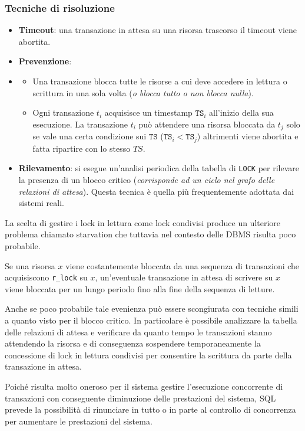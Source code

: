 \documentclass[oneside,a4paper,11pt]{book}
\theoremstyle{italicstyle}
\theoremstyle{normStyle}
\begin{document}
\subsubsection{Tecniche di risoluzione}
\begin{itemize}
  \item \textbf{Timeout}: una transazione in attesa su una risorsa trascorso il timeout viene abortita.
  \item \textbf{Prevenzione}: 
  \item \begin{itemize}
    \item Una transazione blocca tutte le risorse a cui deve accedere in lettura 
    o scrittura in una sola volta (\textit{o blocca tutto o non blocca nulla}).
    \item Ogni transazione $t_i$ acquisisce un timestamp $\texttt{TS}_i$ all'inizio della sua esecuzione.
    La transazione $t_i$ può attendere una risorsa bloccata da $t_j$ solo se vale una certa 
    condizione sui $\texttt{TS}$ ($\texttt{TS}_i < \texttt{TS}_j$) altrimenti viene abortita e fatta ripartire con lo stesso $TS$.
  \end{itemize}
  \item \textbf{Rilevamento}: si esegue un'analisi periodica della tabella di \verb|LOCK| per rilevare la 
  presenza di un blocco critico (\textit{corrisponde ad un ciclo nel grafo 
  delle relazioni di attesa}). Questa tecnica è quella più frequentemente adottata dai sistemi 
  reali.
\end{itemize}
La scelta di gestire i lock in lettura come lock condivisi produce un ulteriore problema chiamato starvation 
che tuttavia nel contesto delle DBMS risulta poco probabile.

Se una risorsa $x$ viene costantemente bloccata da una sequenza di transazioni che acquisiscono 
\verb|r_lock| su $x$, un'eventuale transazione in attesa di scrivere su $x$ viene 
bloccata per un lungo periodo fino alla fine della sequenza di letture.

Anche se poco probabile tale evenienza può essere scongiurata con tecniche 
simili a quanto visto per il blocco critico. In particolare è possibile 
analizzare la tabella delle relazioni di attesa e verificare da quanto tempo 
le transazioni stanno attendendo la risorsa e di conseguenza sospendere 
temporaneamente la concessione di lock in lettura condivisi per consentire la scrittura da parte 
della transazione in attesa.

Poiché risulta molto oneroso per il sistema gestire l'esecuzione concorrente di 
transazioni con conseguente diminuzione delle prestazioni del sistema, SQL 
prevede la possibilità di rinunciare in tutto o in parte al controllo di concorrenza per aumentare le prestazioni 
del sistema.
\end{document}
